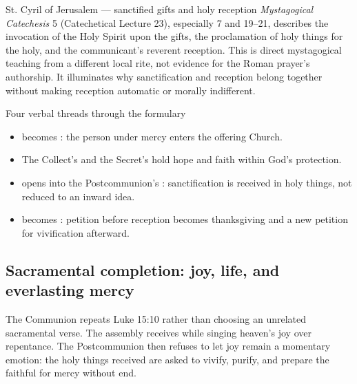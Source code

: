 \begin{deepstudy}
\begin{sourcecard}{St. Cyril of Jerusalem --- sanctified gifts and holy reception}
\emph{Mystagogical Catechesis} 5 (Catechetical Lecture 23), especially 7 and 19--21, describes the invocation of the Holy Spirit upon the gifts, the proclamation of holy things for the holy, and the communicant's reverent reception. This is direct mystagogical teaching from a different local rite, not evidence for the Roman prayer's authorship. It illuminates why sanctification and reception belong together without making reception automatic or morally indifferent.
\end{sourcecard}

\begin{studybox}{Four verbal threads through the formulary}
\begin{itemize}
\item {} becomes : the person under mercy enters the offering Church.
\item The Collect's  and the Secret's  hold hope and faith within God's protection.
\item {} opens into the Postcommunion's : sanctification is received in holy things, not reduced to an inward idea.
\item {} becomes : petition before reception becomes thanksgiving and a new petition for vivification afterward.
\end{itemize}
\end{studybox}

\sectionguard
\subsection*{Sacramental completion: joy, life, and everlasting mercy\enspace{}}

The Communion repeats Luke 15:10 rather than choosing an unrelated sacramental verse. The assembly receives while singing heaven's joy over repentance. The Postcommunion then refuses to let joy remain a momentary emotion: the holy things received are asked to vivify, purify, and prepare the faithful for mercy without end.


\end{deepstudy}

